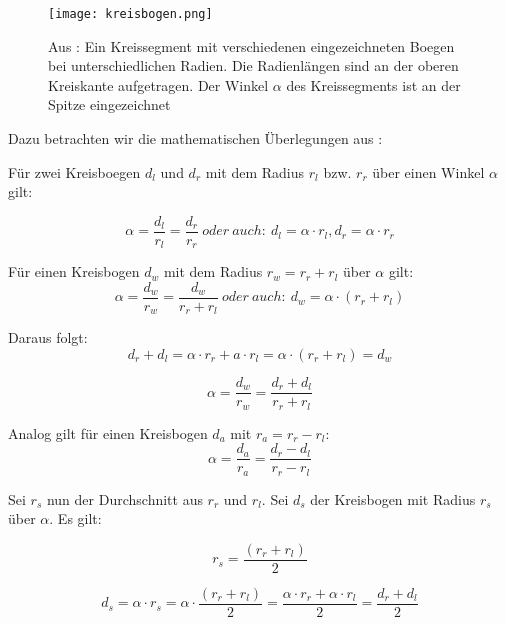 \documentclass[11pt,a4paper]{article}
\begin{document}
\begin{figure}[ht]
  \centering
  \texttt{[image: kreisbogen.png]}
  \caption{Aus \cite{website:dresden}: Ein Kreissegment mit verschiedenen eingezeichneten Boegen bei unterschiedlichen Radien. Die Radienlängen sind an der oberen Kreiskante 
  aufgetragen. Der Winkel $\alpha$ des Kreissegments ist an der Spitze eingezeichnet}
  \label{fig: Kreissegment}
\end{figure}

Dazu betrachten wir die mathematischen Überlegungen aus \cite{website:dresden}:

Für zwei Kreisboegen $d_l$ und $d_r$ mit dem Radius $r_l$ bzw. $r_r$ über einen Winkel $\alpha$ gilt:

\begin{equation}\label{eq:one}
\alpha = \frac{d_l}{r_l} = \frac{d_r}{r_r}~oder~auch:~ d_l = \alpha \cdot r_l, d_r = \alpha \cdot r_r
\end{equation}

Für einen Kreisbogen $d_w$ mit dem Radius $r_w = r_r + r_l$ über $\alpha$ gilt: 
\begin{equation}\label{eq:two}
\alpha = \frac{d_w}{r_w} = \frac{d_w}{r_r+r_l}~oder~auch:~d_w = \alpha \cdot (r_r + r_l)
\end{equation}

Daraus folgt: 
\begin{equation}
d_r + d_l = \alpha \cdot r_r + a \cdot r_l = \alpha \cdot (r_r + r_l) = d_w
\end{equation}

\begin{equation}
\alpha = \frac{d_w}{r_w} = \frac{d_r+d_l}{r_r + r_l}
\end{equation}

Analog gilt für einen Kreisbogen $d_a$ mit $r_a = r_r - r_l$:
\begin{equation}
\alpha = \frac{d_a}{r_a} = \frac{d_r-d_l}{r_r-r_l}
\end{equation}

Sei $r_s$ nun der Durchschnitt aus $r_r$ und $r_l$. Sei $d_s$ der Kreisbogen mit Radius $r_s$ über $\alpha$. Es gilt:

\begin{equation}
  r_s = \frac{(r_r + r_l)}{2}
\end{equation}

\begin{equation}
  d_s = \alpha \cdot r_s = \alpha \cdot \frac{(r_r + r_l)}{2} = \frac{\alpha \cdot r_r + \alpha \cdot r_l}{2} = \frac{d_r + d_l}{2}
\end{equation}
\end{document}
